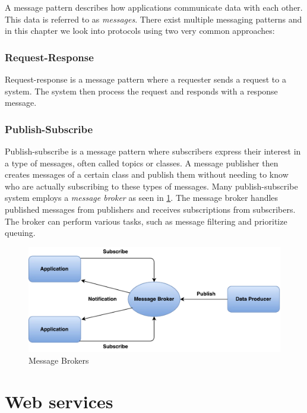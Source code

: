 A message pattern describes how applications communicate data with each other.
This data is referred to as \textit{messages}. There exist multiple messaging
patterns and in this chapter we look into protocols using two very common
approaches:

\subsubsection{Request-Response}

Request-response is a message pattern where a requester sends a request to a
system. The system then process the request and responds with a response
message.

\subsubsection{Publish-Subscribe}

Publish-subscribe is a message pattern where subscribers express their interest
in a type of messages, often called topics or classes. A message publisher then
creates messages of a certain class and publish them without needing to know who are
actually subscribing to these types of messages. Many publish-subscribe system
employs a \textit{message broker} as seen in \cref{figure-message-brokers}. The
message broker handles published messages from publishers and receives
subscriptions from subscribers. The broker can perform various tasks, such as
message filtering and prioritize queuing.

\begin{figure}[h]
\centering
\includegraphics[scale=0.6]{images/pubsub.pdf}
\caption{Message Brokers}
\label{figure-message-brokers}
\end{figure}

\section{Web services}
\label{web-services}

